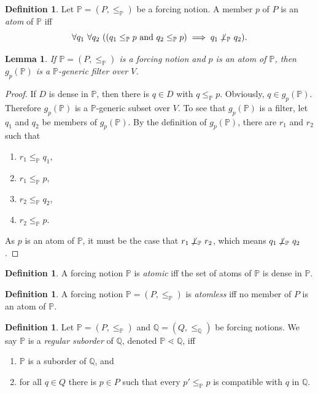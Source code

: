 \documentclass[12pt, twoside]{memoir}
\numberwithin{equation}{section}
\newtheorem{lem}[thm]{Lemma}
\theoremstyle{definition}
\newtheorem{defi}[thm]{Definition}
\theoremstyle{remark}
\theoremstyle{definition}
\theoremstyle{definition}
\theoremstyle{definition}
\theoremstyle{remark}
\begin{document}
\begin{defi}
Let $\mathbb{P} = (P, \leq_{\mathbb{P}})$ be a forcing notion. A member $p$ of $P$ is an \emph{atom} of $\mathbb{P}$ iff $$\forall q_1 \ \forall q_2 \ ((q_1 \leq_{\mathbb{P}} p \text{ and } q_2 \leq_{\mathbb{P}} p) \implies q_1 \not \! \! \bot_{\mathbb{P}} \ q_2).$$
\end{defi}

\begin{lem}\label{gpgeneric}
If $\mathbb{P} = (P, \leq_{\mathbb{P}})$ is a forcing notion and $p$ is an atom of $\mathbb{P}$, then $g_p (\mathbb{P})$ is a $\mathbb{P}$-generic filter over $V$.
\end{lem}

\begin{proof}
If $D$ is dense in $\mathbb{P}$, then there is $q \in D$ with $q \leq_{\mathbb{P}} p$. Obviously, $q \in g_p (\mathbb{P})$. Therefore $g_p (\mathbb{P})$ is a $\mathbb{P}$-generic subset over $V$. To see that $g_p (\mathbb{P})$ is a filter, let $q_1$ and $q_2$ be members of $g_p (\mathbb{P})$. By the definition of $g_p (\mathbb{P})$, there are $r_1$ and $r_2$ such that 
\begin{enumerate}[label=(\alph*)]
    \item $r_1 \leq_{\mathbb{P}} q_1$, 
    \item $r_1 \leq_{\mathbb{P}} p$,
    \item $r_2 \leq_{\mathbb{P}} q_2$,
    \item $r_2 \leq_{\mathbb{P}} p$.
\end{enumerate}
As $p$ is an atom of $\mathbb{P}$, it must be the case that $r_1 \not \! \! \bot_{\mathbb{P}} \ r_2$, which means $q_1 \not \! \! \bot_{\mathbb{P}} \ q_2$.
\end{proof}

\begin{defi}
A forcing notion $\mathbb{P}$ is \emph{atomic} iff the set of atoms of $\mathbb{P}$ is dense in $\mathbb{P}$.
\end{defi}

\begin{defi}
A forcing notion $\mathbb{P} = (P, \leq_{\mathbb{P}})$ is \emph{atomless} iff no member of $P$ is an atom of $\mathbb{P}$.
\end{defi}

\begin{defi}
Let $\mathbb{P} = (P, \leq_{\mathbb{P}})$ and $\mathbb{Q} = (Q, \leq_{\mathbb{Q}})$ be forcing notions. We say $\mathbb{P}$ is a \emph{regular suborder} of $\mathbb{Q}$, denoted $\mathbb{P} \lessdot \mathbb{Q}$, iff 
\begin{enumerate}[label=(\alph*)]
    \item $\mathbb{P}$ is a suborder of $\mathbb{Q}$, and
    \item for all $q \in Q$ there is $p \in P$ such that every $p' \leq_{\mathbb{P}} p$ is compatible with $q$ in $\mathbb{Q}$.
\end{enumerate}
\end{defi}
\end{document}
